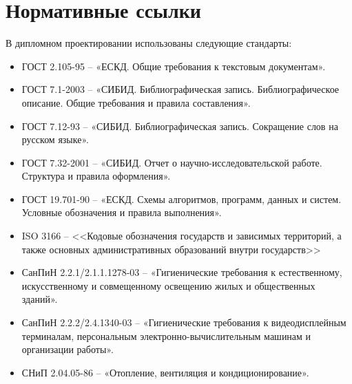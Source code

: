 \section*{Нормативные ссылки}

В дипломном проектировании использованы следующие стандарты:
\begin{itemize}
\item ГОСТ 2.105-95 -- «ЕСКД. Общие требования к текстовым документам».
\item ГОСТ 7.1-2003  -- «СИБИД. Библиографическая запись. Библиографическое описание. Общие требования и правила составления».
\item ГОСТ 7.12-93 -- «СИБИД. Библиографическая запись. Сокращение слов на русском языке».
\item ГОСТ 7.32-2001 -- «СИБИД. Отчет о научно-исследовательской работе. Структура и правила оформления».
\item ГОСТ 19.701-90 -- «ЕСКД. Схемы алгоритмов, программ, данных и систем. Условные обозначения и правила выполнения».
\item ISO 3166 -- <<Кодовые обозначения государств и зависимых территорий, а также основных административных образований внутри государств>>
\item СанПиН 2.2.1/2.1.1.1278-03 -- «Гигиенические требования к естественному, искусственному и совмещенному освещению жилых и общественных зданий».
\item СанПиН 2.2.2/2.4.1340-03 -- «Гигиенические требования к видеодисплейным терминалам, персональным электронно-вычислительным машинам и организации работы».
\item СНиП 2.04.05-86  --  «Отопление, вентиляция и кондиционирование».
\end{itemize}

